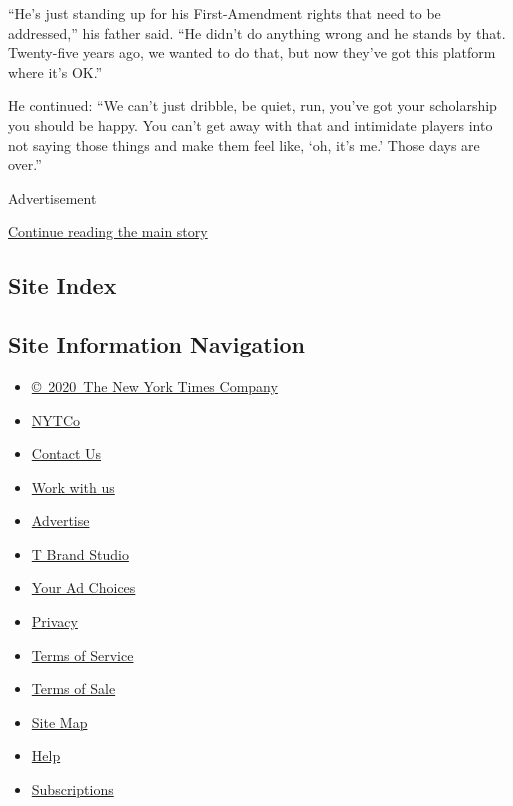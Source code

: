 ``He's just standing up for his First-Amendment rights that need to be
addressed,'' his father said. ``He didn't do anything wrong and he
stands by that. Twenty-five years ago, we wanted to do that, but now
they've got this platform where it's OK.''

He continued: ``We can't just dribble, be quiet, run, you've got your
scholarship you should be happy. You can't get away with that and
intimidate players into not saying those things and make them feel like,
`oh, it's me.' Those days are over.''

Advertisement

\protect\hyperlink{after-bottom}{Continue reading the main story}

\hypertarget{site-index}{%
\subsection{Site Index}\label{site-index}}

\hypertarget{site-information-navigation}{%
\subsection{Site Information
Navigation}\label{site-information-navigation}}

\begin{itemize}
\tightlist
\item
  \href{https://help.nytimes.com/hc/en-us/articles/115014792127-Copyright-notice}{©~2020~The
  New York Times Company}
\end{itemize}

\begin{itemize}
\tightlist
\item
  \href{https://www.nytco.com/}{NYTCo}
\item
  \href{https://help.nytimes.com/hc/en-us/articles/115015385887-Contact-Us}{Contact
  Us}
\item
  \href{https://www.nytco.com/careers/}{Work with us}
\item
  \href{https://nytmediakit.com/}{Advertise}
\item
  \href{http://www.tbrandstudio.com/}{T Brand Studio}
\item
  \href{https://www.nytimes.com/privacy/cookie-policy\#how-do-i-manage-trackers}{Your
  Ad Choices}
\item
  \href{https://www.nytimes.com/privacy}{Privacy}
\item
  \href{https://help.nytimes.com/hc/en-us/articles/115014893428-Terms-of-service}{Terms
  of Service}
\item
  \href{https://help.nytimes.com/hc/en-us/articles/115014893968-Terms-of-sale}{Terms
  of Sale}
\item
  \href{https://spiderbites.nytimes.com}{Site Map}
\item
  \href{https://help.nytimes.com/hc/en-us}{Help}
\item
  \href{https://www.nytimes.com/subscription?campaignId=37WXW}{Subscriptions}
\end{itemize}
